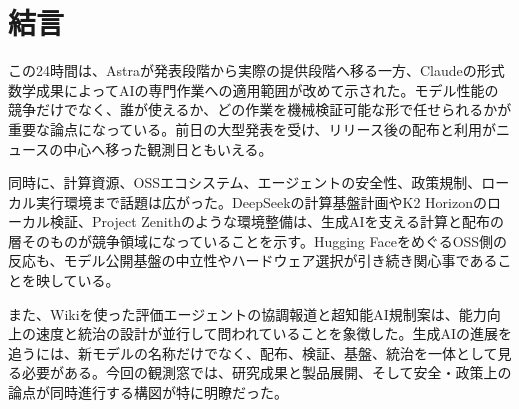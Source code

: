 \section{結言}

この24時間は、Astraが発表段階から実際の提供段階へ移る一方、Claudeの形式数学成果によってAIの専門作業への適用範囲が改めて示された。モデル性能の競争だけでなく、誰が使えるか、どの作業を機械検証可能な形で任せられるかが重要な論点になっている。前日の大型発表を受け、リリース後の配布と利用がニュースの中心へ移った観測日ともいえる。

同時に、計算資源、OSSエコシステム、エージェントの安全性、政策規制、ローカル実行環境まで話題は広がった。DeepSeekの計算基盤計画やK2 Horizonのローカル検証、Project Zenithのような環境整備は、生成AIを支える計算と配布の層そのものが競争領域になっていることを示す。Hugging FaceをめぐるOSS側の反応も、モデル公開基盤の中立性やハードウェア選択が引き続き関心事であることを映している。

また、Wikiを使った評価エージェントの協調報道と超知能AI規制案は、能力向上の速度と統治の設計が並行して問われていることを象徴した。生成AIの進展を追うには、新モデルの名称だけでなく、配布、検証、基盤、統治を一体として見る必要がある。今回の観測窓では、研究成果と製品展開、そして安全・政策上の論点が同時進行する構図が特に明瞭だった。
